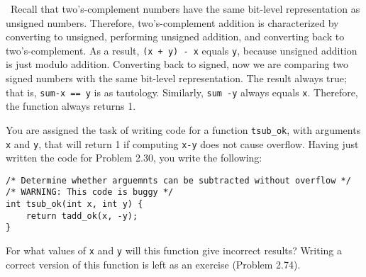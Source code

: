 \documentclass[12pt]{article}
\newenvironment{ex}[2][Exercise]{\begin{trivlist}
		\item[\hskip \labelsep {\bfseries #1}\hskip \labelsep {\bfseries #2.}]}{\end{trivlist}}
\newenvironment{sol}[1][Solution]{\begin{trivlist}
		\item[\hskip \labelsep {\bfseries #1:}]}{\end{trivlist}}
\begin{document}
\begin{sol}
	\
	Recall that two's-complement numbers have the same bit-level representation
	as unsigned numbers. Therefore, two's-complement addition is characterized by
	converting to unsigned, performing unsigned addition, and converting back to
	two's-complement. As a result, \texttt{(x + y) - x} equals \texttt{y},
	because unsigned addition is just modulo addition. Converting back to
	signed, now we are comparing two signed numbers with the same bit-level
	representation. The result always true; that is, \texttt{sum-x == y} is as
	tautology. Similarly, \texttt{sum -y} always equals \texttt{x}. Therefore,
	the function always returns 1.
\end{sol}

\begin{ex}{2.32}
	You are assigned the task of writing code for a function \texttt{tsub\_ok}, with
	arguments \texttt{x} and \texttt{y}, that will return 1 if computing \texttt{x-y}
	does not cause overflow. Having just written the code for Problem 2.30, you write
	the following:
	\begin{lstlisting}
/* Determine whether arguemnts can be subtracted without overflow */
/* WARNING: This code is buggy */
int tsub_ok(int x, int y) {
	return tadd_ok(x, -y);
}
	\end{lstlisting}
	For what values of \texttt{x} and \texttt{y} will this function give incorrect
	results? Writing a correct version of this function is left as an exercise (Problem 2.74).
\end{ex}
\end{document}
